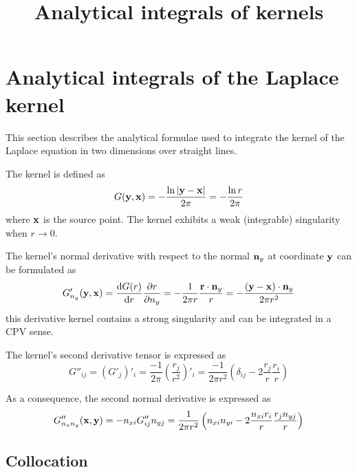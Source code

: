 \documentclass[a4paper,11pt]{article}
\title {Analytical integrals of kernels}
\newcommand{\td}{\mathrm{d}}
\begin{document}
\maketitle

\tableofcontents

\section{Analytical integrals of the Laplace kernel}

This section describes the analytical formulae used to integrate the kernel of the Laplace equation in two dimensions over straight lines.

The kernel is defined as
%
\begin{equation}
	G({\bf y}, {\bf x}) = -\frac{\ln |{\bf y}-{\bf x}|}{2\pi} = -\frac{\ln r}{2\pi}
\end{equation}
%
where ${\bf x}$ is the source point. The kernel exhibits a weak (integrable) singularity when $r \to 0$.

The kernel's normal derivative with respect to the normal  ${\bf n}_y$ at coordinate ${\bf y}$ can be formulated as
%
\begin{equation}
	G'_{n_y}({\bf y}, {\bf x}) = \frac{\td G(r)}{\td r} \frac{\partial r}{\partial n_y} = -\frac{1}{2\pi r} \frac{{\bf r} \cdot {\bf n}_y}{r} = -\frac{({\bf y}-{\bf x}) \cdot {\bf n}_y}{2\pi r^2}
\end{equation}
%
this derivative kernel contains a strong singularity and can be integrated in a CPV sense.

The kernel's second derivative tensor is expressed as
%
\begin{equation}
	G''_{ij} = \left(G'_j\right)'_i
	= \frac{-1}{2\pi}\left(\frac{r_j}{r^2}\right)'_i
	= \frac{-1}{2\pi r^2}\left( \delta_{ij} - 2\frac{r_j}{r} \frac{r_i}{r}\right)
\end{equation}

As a consequence, the second normal derivative is expressed as
%
\begin{equation}
	G''_{n_x n_y}({\bf x}, {\bf y})
	= -n_{xi} G''_{ij} n_{yj}
	=  \frac{1}{2\pi r^2} \left( n_{xi} n_{yi} - 2\frac{n_{xi} r_i}{r} \frac{r_j n_{yj}}{r}\right)
\end{equation}


\subsection{Collocation}
\end{document}
